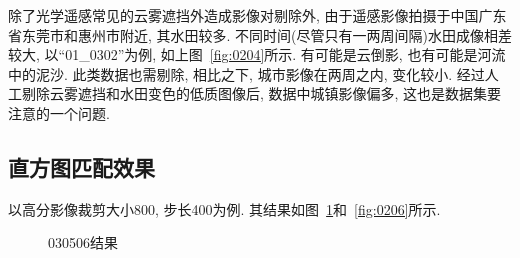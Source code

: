 除了光学遥感常见的云雾遮挡外造成影像对剔除外, 由于遥感影像拍摄于中国广东省东莞市和惠州市附近, 其水田较多. 不同时间(尽管只有一两周间隔)水田成像相差较大, 以``01\_0302''为例, 如上图~\ref{fig:0204}所示. 有可能是云倒影, 也有可能是河流中的泥沙. 此类数据也需剔除, 相比之下, 城市影像在两周之内, 变化较小. 经过人工剔除云雾遮挡和水田变色的低质图像后, 数据中城镇影像偏多, 这也是数据集要注意的一个问题.

\subsection{直方图匹配效果}
以高分影像裁剪大小800, 步长400为例. 其结果如图~\ref{fig:0205}和~\ref{fig:0206}所示.

\begin{figure}[!htbp]
    \centering
    \quad
    \quad
    \caption{030506结果}
    \label{fig:0205}
\end{figure}

